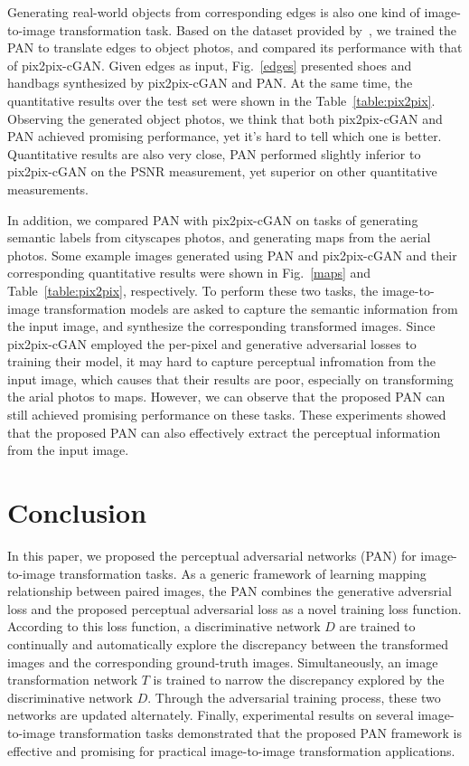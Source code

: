 \documentclass{article}
\begin{document}
Generating real-world objects from corresponding edges is also one kind of image-to-image transformation task. Based on the dataset provided by~\cite{isola2016image}, we trained the PAN to translate edges to object photos, and compared its performance with that of pix2pix-cGAN. Given edges as input, Fig.~\ref{edges} presented shoes and handbags synthesized by pix2pix-cGAN and PAN. At the same time, the quantitative results over the test set were shown in the Table~\ref{table:pix2pix}. Observing the generated object photos, we think that both pix2pix-cGAN and PAN achieved promising performance, yet it's hard to tell which one is better. Quantitative results are also very close, PAN performed slightly inferior to pix2pix-cGAN on the PSNR measurement, yet superior on other quantitative measurements.

In addition, we compared PAN with pix2pix-cGAN on tasks of generating semantic labels from cityscapes photos, and generating maps from the aerial photos. Some example images generated using PAN and pix2pix-cGAN and their corresponding quantitative results were shown in Fig.~\ref{maps} and Table~\ref{table:pix2pix}, respectively. To perform these two tasks, the image-to-image transformation models are asked to capture the semantic information from the input image, and synthesize the corresponding transformed images. Since pix2pix-cGAN employed the per-pixel and generative adversarial losses to training their model, it may hard to capture perceptual infromation from the input image, which causes that their results are poor, especially on transforming the arial photos to maps. However, we can observe that the proposed PAN can still achieved promising performance on these tasks. These experiments showed that the proposed PAN can also effectively extract the perceptual information from the input image.

\section{Conclusion}
\label{sec:conclusion}
In this paper, we proposed the perceptual adversarial networks (PAN) for image-to-image transformation tasks. As a generic framework of learning mapping relationship between paired images, the PAN combines the generative adversrial loss and the proposed perceptual adversarial loss as a novel training loss function. According to this loss function, a discriminative network $D$ are trained to continually and automatically explore the discrepancy between the transformed images and the corresponding ground-truth images. Simultaneously, an image transformation network $T$ is trained to narrow the discrepancy explored by the discriminative network $D$. Through the adversarial training process, these two networks are updated alternately. Finally, experimental results on several image-to-image transformation tasks demonstrated that the proposed PAN framework is effective and promising for practical image-to-image transformation applications. 



\end{document}
